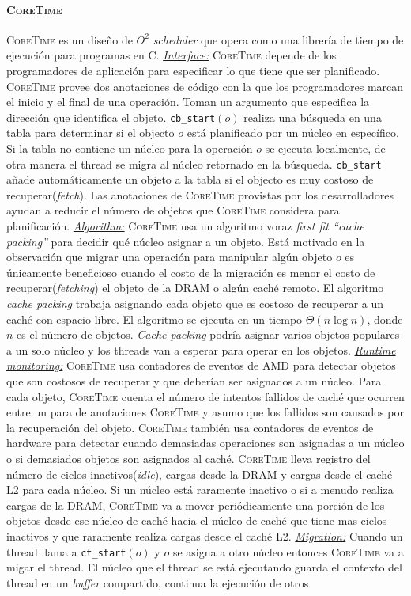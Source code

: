 \paragraph{\textnormal{\textbf{\textsc{CoreTime}}}}
\textsc{CoreTime} es un diseño de $O^2$ \emph{scheduler} que opera como una librería de tiempo de ejecución para programas en C. \underline{\emph{Interface:}} \textsc{CoreTime} depende de los programadores de aplicación para especificar lo que tiene que ser planificado. \textsc{CoreTime} provee dos anotaciones de código con la que los programadores marcan el inicio y el final de una operación. Toman un argumento que especifica la dirección que identifica el objeto. \texttt{cb\_start}$(o)$ realiza una búsqueda en una tabla para determinar si el objecto $o$ está planificado por un núcleo en específico. Si la tabla no contiene un núcleo para la operación $o$  se ejecuta localmente, de otra manera el thread se migra al núcleo retornado en la búsqueda. \texttt{cb\_start} añade automáticamente un objeto a la tabla si el objecto es muy costoso de recuperar(\emph{fetch}). Las anotaciones de \textsc{CoreTime} provistas por los desarrolladores ayudan a reducir el número de objetos que \textsc{CoreTime} considera para planificación. \underline{\emph{Algorithm:}} \textsc{CoreTime} usa un algoritmo voraz \emph{first fit ``cache packing''} para decidir qué núcleo asignar a un objeto. Está motivado en la observación que migrar una operación para manipular algún objeto $o$ es únicamente beneficioso cuando el costo de la migración es menor el costo de recuperar(\emph{fetching}) el objeto de la DRAM o algún caché remoto. El algoritmo \emph{cache packing} trabaja asignando cada objeto que es costoso de recuperar a un caché con espacio libre. El algoritmo se ejecuta en un tiempo $\Theta(n \log n)$, donde $n$ es el número de objetos. \emph{Cache packing} podría asignar varios objetos populares a un solo núcleo y los threads van a esperar para operar en los objetos. \underline{\emph{Runtime monitoring:}} \textsc{CoreTime} usa contadores de eventos de AMD para detectar objetos que son costosos de recuperar y que deberían ser asignados a un núcleo. Para cada objeto, \textsc{CoreTime} cuenta el número de intentos fallidos de caché que ocurren entre un para de anotaciones \textsc{CoreTime} y asumo que los fallidos son causados por la recuperación del objeto. \textsc{CoreTime} también usa contadores de eventos de hardware para detectar cuando demasiadas operaciones son asignadas a un núcleo o si demasiados objetos son asignados al caché. \textsc{CoreTime} lleva registro del número de ciclos inactivos(\emph{idle}), cargas desde la DRAM y cargas desde el caché L2 para cada núcleo. Si un núcleo está raramente inactivo o si a menudo realiza cargas de la DRAM, \textsc{CoreTime} va a mover periódicamente una porción de los objetos desde ese núcleo de caché hacia el núcleo de caché que tiene mas ciclos inactivos y que raramente realiza cargas desde el caché L2. \underline{\emph{Migration:}} Cuando un thread llama a \texttt{ct\_start}$(o)$ y $o$ se asigna a otro núcleo entonces \textsc{CoreTime} va a migar el thread. El núcleo que el thread se está ejecutando guarda el contexto del thread en un \emph{buffer} compartido, continua la ejecución de otros 